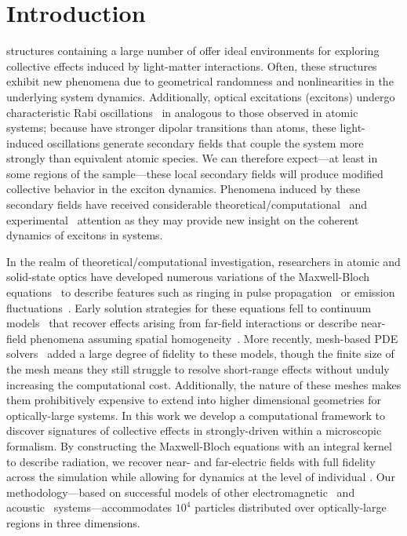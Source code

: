 \section{\label{section:introduction}Introduction}

 structures containing a large number of \qds{} offer ideal environments for exploring collective effects induced by light-matter interactions.
Often, these structures exhibit new phenomena due to geometrical randomness and nonlinearities in the underlying system dynamics.
Additionally, optical excitations (excitons) undergo characteristic Rabi oscillations~\cite{Stievater2001,Kamada2001,Htoon2002} in \qds{} analogous to those observed in atomic systems; because \qds{} have stronger dipolar transitions than atoms, these light-induced oscillations generate secondary fields that couple the system more strongly than equivalent atomic species.
We can therefore expect---at least in some regions of the sample---these local secondary fields will produce modified collective behavior in the exciton dynamics.
Phenomena induced by these secondary fields have received considerable theoretical/computational~\cite{Slepyan2002,Slepyan2004} and experimental~\cite{Asakura2013} attention as they may provide new insight on the coherent dynamics of excitons in \qd{} systems.

In the realm of theoretical/computational investigation, researchers in atomic and solid-state optics have developed numerous variations of the Maxwell-Bloch equations~\cite{Gross1982} to describe features such as ringing in pulse propagation~\cite{Burnham1969,MacGillivray1976} or emission fluctuations~\cite{Haake1979}.
Early solution strategies for these equations fell to continuum models~\cite{Rehler1971,MacGillivray1976} that recover effects arising from far-field interactions or describe near-field phenomena assuming spatial homogeneity~\cite{Stroud1972}.
More recently, mesh-based PDE solvers~\cite{Vanneste2001,Fratalocchi2008,Bachelard2015} added a large degree of fidelity to these models, though the finite size of the mesh means they still struggle to resolve short-range effects without unduly increasing the computational cost.
Additionally, the nature of these meshes makes them prohibitively expensive to extend into higher dimensional geometries for optically-large systems.
In this work we develop a computational framework to discover signatures of collective effects in strongly-driven \qds{} within a microscopic formalism.
By constructing the Maxwell-Bloch equations with an integral kernel to describe radiation, we recover near- and far-electric fields with full fidelity across the simulation while allowing for dynamics at the level of individual \qds{}.
Our methodology---based on successful models of other electromagnetic~\cite{Shanker2000,Pray2012,Pray2014} and acoustic~\cite{Ergin1999a,Ergin1999b,Glosser2016} systems---accommodates $10^4$ particles distributed over optically-large regions in three dimensions.

